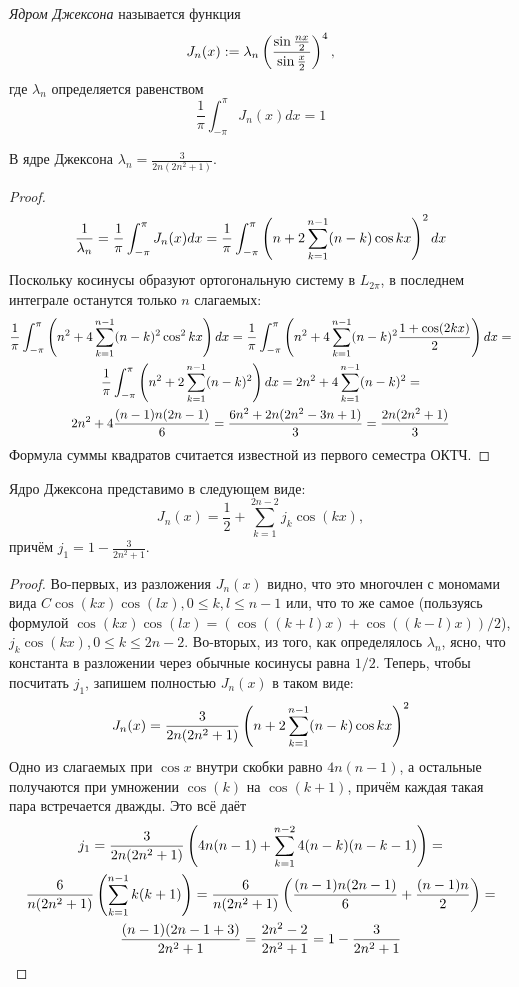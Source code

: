 \begin{definition}
	\textit{Ядром Джексона} называется функция
	\[
		J_n(x) := \lambda_n \left(\frac{\sin\frac{nx}{2}}{\sin\frac{x}{2}}\right)^4,
	\]
	где $\lambda_n$ определяется равенством
	\[
		\frac{1}{\pi} \int_{-\pi}^\pi J_n(x)dx = 1
	\]
\end{definition}

\begin{lemma}
	В ядре Джексона $\lambda_n = \frac{3}{2n(2n^2 + 1)}$.
\end{lemma}

\begin{proof}
	\[
		\frac{1}{\lambda_n} = \frac{1}{\pi} \int_{-\pi}^\pi J_n(x)dx = \frac{1}{\pi} \int_{-\pi}^{\pi} \left(n + 2\sum_{k=1}^{n-1} (n - k)\cos kx\right)^2dx
	\]
	Поскольку косинусы образуют ортогональную систему в $L_{2\pi}$, в последнем интеграле останутся только $n$ слагаемых:
	\begin{multline*}
		\frac{1}{\pi} \int_{-\pi}^{\pi} \left(n^2 + 4\sum_{k=1}^{n-1} (n - k)^2\cos^2kx\right)dx = \frac{1}{\pi} \int_{-\pi}^{\pi} \left(n^2 + 4\sum_{k=1}^{n-1} (n - k)^2\frac{1 + \cos(2kx)}{2}\right)dx = \\
		\frac{1}{\pi} \int_{-\pi}^{\pi} \left(n^2 + 	2\sum_{k=1}^{n-1} (n - k)^2\right)dx = 2n^2 + 4\sum_{k=1}^{n-1} (n - k)^2 = \\
		2n^2 + 4\frac{(n-1)n(2n-1)}{6} = \frac{6n^2 + 2n(2n^2 - 3n + 1)}{3} = \frac{2n(2n^2+1)}{3}
	\end{multline*}
	Формула суммы квадратов считается известной из первого семестра ОКТЧ.
\end{proof}

\begin{lemma} \label{michael_jackson}
	Ядро Джексона представимо в следующем виде:
	\[
		J_n(x) = \frac{1}{2} + \sum_{k=1}^{2n-2} j_k \cos(kx),
	\]
	причём $j_1 = 1 - \frac{3}{2n^2 + 1}$.
\end{lemma}

\begin{proof}
	Во-первых, из разложения $J_n(x)$ видно, что это многочлен с мономами вида $C\cos(kx)\cos(lx), 0 \leq k, l \leq n - 1$ или, что то же самое (пользуясь формулой $\cos(kx)\cos(lx) = (\cos((k + l)x) + \cos((k - l)x))/2$),  $j_k \cos(kx), 0 \leq k \leq 2n - 2$.
	Во-вторых, из того, как определялось $\lambda_n$, ясно, что константа в разложении через обычные косинусы равна $1/2$. Теперь, чтобы посчитать $j_1$, запишем полностью $J_n(x)$ в таком виде:
	\[
		J_n(x) = \frac{3}{2n(2n^2 + 1)} \left(n + 2\sum_{k=1}^{n-1} (n - k)\cos kx\right)^2
	\]
	Одно из слагаемых при $\cos x$ внутри скобки равно $4n(n-1)$, а остальные получаются при умножении $\cos(k)$ на $\cos(k+1)$, причём каждая такая пара встречается дважды. Это всё даёт
	\begin{multline*}
		j_1 =  \frac{3}{2n(2n^2 + 1)} \left(4n(n-1) + \sum_{k=1}^{n-2} 4(n-k)(n-k-1)\right) = \\
		\frac{6}{n(2n^2 + 1)} \left(\sum_{k=1}^{n-1} k(k+1)\right) =
		\frac{6}{n(2n^2 + 1)} \left(\frac{(n-1)n(2n-1)}{6} + \frac{(n-1)n}{2}\right) = \\ \frac{(n-1)(2n - 1 + 3)}{2n^2 + 1} = \frac{2n^2 - 2}{2n^2 + 1} = 1 - \frac{3}{2n^2 + 1}
	\end{multline*}
\end{proof}

